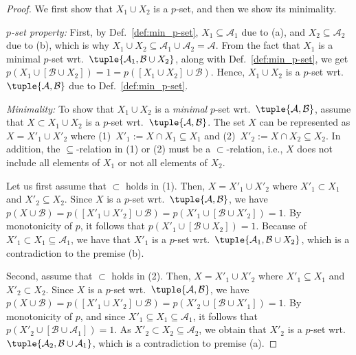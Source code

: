 \documentclass[]{elsarticle}
\newcommand{\ma}{\mathcal{A}}
\newcommand{\mb}{\mathcal{B}}
\begin{document}
	\begin{proof} We first show that $X_1 \cup X_2$ is a $p$-set, and then we show its minimality.\vspace{5pt}
		
		\noindent\emph{$p$-set property:}
		First, by Def.~\ref{def:min_p-set}, $X_1 \subseteq \ma_1$ due to (a), and $X_2 \subseteq \ma_2$ due to (b), which is why $X_1 \cup X_2 \subseteq \ma_1 \cup \ma_2 = \ma$.
		From the fact that $X_1$ is a minimal $p$-set wrt.\ $\tuple{\ma_1, \mb \cup X_2}$, along with Def.~\ref{def:min_p-set}, we get $p(X_1 \cup [\mb \cup X_2]) = 1 = p([X_1 \cup X_2] \cup \mb)$. Hence, 
		$X_1 \cup X_2$ is a $p$-set wrt.\ $\tuple{\ma,\mb}$ 
		due to Def.~\ref{def:min_p-set}.\vspace{5pt} 
		
		\noindent\emph{Minimality:}
		To show that $X_1 \cup X_2$ is a \emph{minimal} $p$-set wrt.\ $\tuple{\ma,\mb}$, assume that $X \subset X_1 \cup X_2$ is a $p$-set wrt.\ $\tuple{\ma,\mb}$. 
		The set $X$ can be represented as $X=X'_1 \cup X'_2$ where (1)~$X'_1 := X \cap X_1 \subseteq X_1$ and (2)~$X'_2 := X \cap X_2 \subseteq X_2$. In addition, the $\subseteq$-relation in (1) or (2) must be a $\subset$-relation, i.e., $X$ does not include all elements of $X_1$ or not all elements of $X_2$.
		
		Let us first assume that $\subset$ holds in (1). Then, $X= X'_1 \cup X'_2$ where $X'_1 \subset X_1$ and $X'_2 \subseteq X_2$. Since $X$ is a $p$-set wrt.\ $\tuple{\ma,\mb}$, we have $p(X\cup \mb) = p([X'_1 \cup X'_2] \cup \mb) = p(X'_1 \cup [\mb \cup X'_2])=1$. By monotonicity of $p$, it follows that $p(X'_1 \cup [\mb \cup X_2])=1$. Because of $X'_1 \subset X_1 \subseteq \ma_1$, we have that $X'_1$ is a $p$-set wrt.\ $\tuple{\ma_1,\mb\cup X_2}$, which is a contradiction to the premise (b). %
		
		Second, assume that $\subset$ holds in (2). Then, $X= X'_1 \cup X'_2$ where $X'_1 \subseteq X_1$ and $X'_2 \subset X_2$. Since $X$ is a $p$-set wrt.\ $\tuple{\ma,\mb}$, we have $p(X\cup \mb) = p([X'_1 \cup X'_2] \cup \mb) = p(X'_2 \cup [\mb \cup X'_1])=1$. By monotonicity of $p$, and since $X'_1 \subseteq X_1 \subseteq \ma_1$, it follows that $p(X'_2 \cup [\mb \cup \ma_1])=1$. As $X'_2 \subset X_2 \subseteq \ma_2$, we obtain that $X'_2$ is a $p$-set wrt.\ $\tuple{\ma_2,\mb \cup \ma_1}$, which is a contradiction to premise (a). 
	\end{proof}
	
\end{document}
